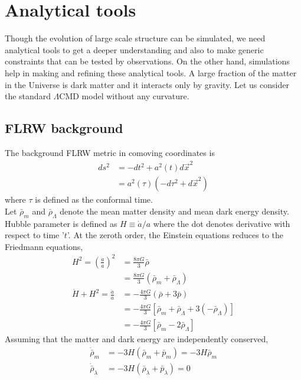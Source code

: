 \documentclass[12pt,twocolumn]{article}
\begin{document}
\section{Analytical tools}
Though the evolution of large scale structure can be simulated, we need analytical tools to get a deeper understanding and also to make generic constraints that can be tested by observations. On the other hand, simulations help in making and refining these analytical tools. A large fraction of the matter in the Universe is dark matter and it interacts only by gravity. Let us consider the standard $\Lambda$CMD model without any curvature.\\

\subsection{FLRW background}
The background FLRW metric in comoving coordinates is
\begin{align}
ds^2 &= -dt^2 + a^2(t) d\vec{x}^2\\
&= a^2(\tau) \left( -d\tau^2 + d\vec{x}^2 \right) 
\end{align}
where $\tau$ is defined as the conformal time.\\
Let $\bar{\rho}_{m}$ and $\bar{\rho}_{\Lambda}$ denote the mean matter density and mean dark energy density. Hubble parameter is defined as $H \equiv \dot{a}/a$ where the dot denotes derivative with respect to time '$t$'. At the zeroth order, the Einstein equations reduces to the Friedmann equations,
\begin{align}
\nonumber
H^2 = \left(\frac{\dot{a}}{a}\right)^2 &= \frac{8 \pi G}{3} \bar{\rho} \\
\label{eq:fried-eqn-1}
&= \frac{8 \pi G}{3} \left( \bar{\rho}_{m} + \bar{\rho}_{\Lambda} \right) \\
\nonumber
\dot{H} + H^2 = \frac{\ddot{a}}{a} &= - \frac{4\pi G}{3} \left(\bar{\rho} + 3\bar{p} \right)\\
\nonumber
&= - \frac{4\pi G}{3} \left[ \bar{\rho}_{m} + \bar{\rho}_{\Lambda} + 3 (-\bar{\rho}_{\Lambda}) \right]\\
\label{eq:fried-eqn-2}
&= - \frac{4\pi G}{3} \left[ \bar{\rho}_{m} - 2 \bar{\rho}_{\Lambda} \right] 
\end{align}
%
Assuming that the matter and dark energy are independently conserved,
\begin{align}
\dot{\bar{\rho}}_{m} &= -3 H \left(\bar{\rho}_{m} + {\bar{p}_{m}}\right) = - 3 H \bar{\rho}_{m} \\
\dot{\bar{\rho}}_{\lambda} &= -3 H \left(\bar{\rho}_{\lambda} + \bar{p}_{\lambda} \right) = 0
\end{align}
\end{document}
